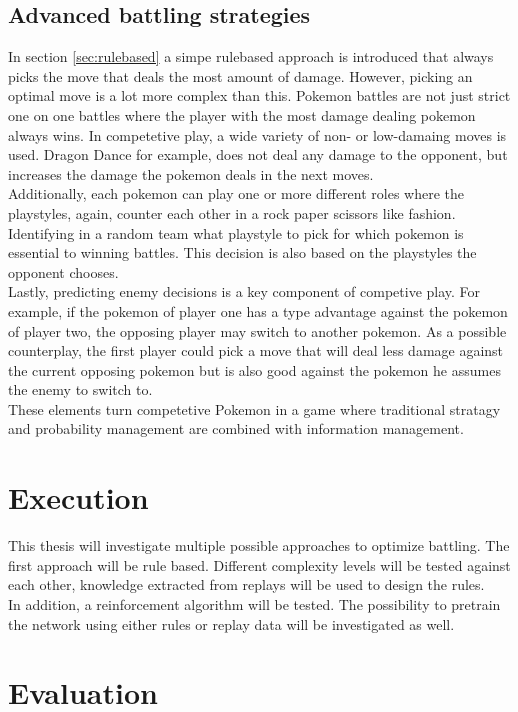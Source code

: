\documentclass{article}
\begin{document}
\subsection{Advanced battling strategies}
In section \ref{sec:rulebased} a simpe rulebased approach is introduced that 
always picks the move that deals the most amount of damage. However, picking 
an optimal move is a lot more complex than this. Pokemon battles are not just
strict one on one battles where the player with the most damage dealing pokemon
always wins. In competetive play, a wide variety of non- or low-damaing moves
is used. Dragon Dance for example, does not deal any damage to the opponent, 
but increases the damage the pokemon deals in the next moves. \\
Additionally, each pokemon can play one or more different roles where the 
playstyles, again, counter each other in a rock paper scissors like fashion. 
Identifying in a random team what playstyle to pick for which pokemon is
essential to winning battles. This decision is also based on the playstyles
the opponent chooses. \\
Lastly, predicting enemy decisions is a key component of competive play. For 
example, if the pokemon of player one has a type advantage against the pokemon 
of player two, the opposing player may switch to another pokemon. As a possible
counterplay, the first player could pick a move that will deal less damage
against the current opposing pokemon but is also good against the pokemon
he assumes the enemy to switch to. \\
These elements turn competetive Pokemon in a game where traditional stratagy
and probability management are combined with information management.

\section{Execution}
This thesis will investigate multiple possible approaches to optimize battling.
The first approach will be rule based. Different complexity levels will be
tested against each other, knowledge extracted from replays will be used to design the rules. \\
In addition, a reinforcement algorithm will be tested. The possibility to pretrain
the network using either rules or replay data will be investigated as well.

\section{Evaluation}
\end{document}
